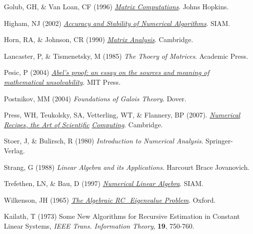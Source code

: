 \noindent Golub, GH, \& Van Loan, CF (1996) \href{http://books.google.com/books?id=mlOa7wPX6OYC&printsec=frontcover}{\it Matrix Computations}. Johns Hopkins.\vskip0.1in

\noindent Higham, NJ (2002) \href{http://books.google.com/books?id=epilvM5MMxwC&printsec=frontcover}{\it Accuracy and Stability of Numerical Algorithms}.  SIAM.\vskip0.1in

\noindent Horn, RA, \& Johnson, CR (1990) \href{http://books.google.com/books?id=9wTacOjHE6IC&printsec=frontcover}{\it Matrix Analysis}.  Cambridge.\vskip0.1in

\noindent Lancaster, P, \& Tismenetsky, M (1985) {\it The Thoery of Matrices}.  Academic Press.\vskip0.1in

\noindent Pesic, P (2004) \href{http://books.google.com/books?id=nIpGp9Y5AlEC&printsec=frontcover}{\it Abel's proof:
an essay on the sources and meaning of mathematical unsolvability}.  MIT Press.

\noindent Postnikov, MM (2004) {\it Foundations of Galois Theory}. Dover.\vskip0.1in

\noindent Press, WH, Teukolsky, SA, Vetterling, WT, \& Flannery, BP (2007). \href{http://www.nr.com/}{\it Numerical Recipes, the Art of Scientific}
\href{http://www.nr.com/}{\it Computing}. Cambridge.\vskip0.1in

\noindent Stoer, J, \& Bulirsch, R (1980) {\it Introduction to Numerical Analysis}.  Springer-Verlag.\vskip0.1in

\noindent Strang, G (1988) {\it Linear Algebra and its Applications}.  Harcourt Brace Jovanovich.\vskip0.1in

\noindent Trefethen, LN, \& Bau, D (1997) \href{http://books.google.com/books?id=bj-Lu6zjWbEC&printsec=frontcover}{\it Numerical Linear Algebra}.  SIAM.\vskip0.1in

\noindent Wilkenson, JH (1965) \href{http://books.google.com/books?id=5wsK1OP7UFgC&printsec=frontcover}{\it The Algebraic RC_Eigenvalue Problem}.  Oxford.\vskip0.1in

\noindent Kailath, T (1973) Some New Algorithms for Recursive Estimation in Constant Linear Systems, {\it IEEE Trans. Information Theory}, {\bf 19}, 750-760.
